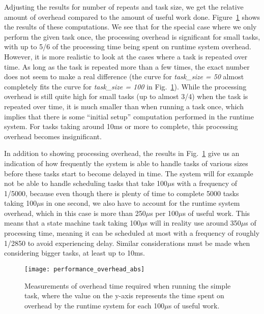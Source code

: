 Adjusting the results for number of repeats and task size, we get the relative amount of overhead compared to the amount of useful work done. Figure~\ref{fig:performance_overhead_abs} shows the results of these computations. We see that for the special case where we only perform the given task once, the processing overhead is significant for small tasks, with up to 5/6 of the processing time being spent on runtime system overhead. However, it is more realistic to look at the cases where a task is repeated over time. As long as the task is repeated more than a few times, the exact number does not seem to make a real difference (the curve for \emph{task\_size = 50} almost completely fits the curve for \emph{task\_size = 100} in Fig.~\ref{fig:performance_overhead_abs}). While the processing overhead is still quite high for small tasks (up to almost 3/4) when the task is repeated over time, it is much smaller than when running a task once, which implies that there is some ``initial setup'' computation performed in the runtime system. For tasks taking around 10ms or more to complete, this processing overhead becomes insignificant.

In addition to showing processing overhead, the results in Fig.~\ref{fig:performance_overhead_abs} give us an indication of how frequently the system is able to handle tasks of various sizes before these tasks start to become delayed in time. The system will for example not be able to handle scheduling tasks that take 100$\mu$s with a frequency of 1/5000, because even though there is plenty of time to complete 5000 tasks taking 100$\mu$s in one second, we also have to account for the runtime system overhead, which in this case is more than 250$\mu$s per 100$\mu$s of useful work. This means that a state machine task taking 100$\mu$s will in reality use around 350$\mu$s of processing time, meaning it can be scheduled at most with a frequency of roughly 1/2850 to avoid experiencing delay. Similar considerations must be made when considering bigger tasks, at least up to 10ms.

\begin{figure}[htp]
	\centering
	\texttt{[image: performance\_overhead\_abs]}
	\caption[Results of performance overhead test, absolute comparison]{Measurements of overhead time required when running the simple task, where the value on the y-axis represents the time spent on overhead by the runtime system for each 100$\mu$s of useful work.}
	\label{fig:performance_overhead_abs}
\end{figure}

